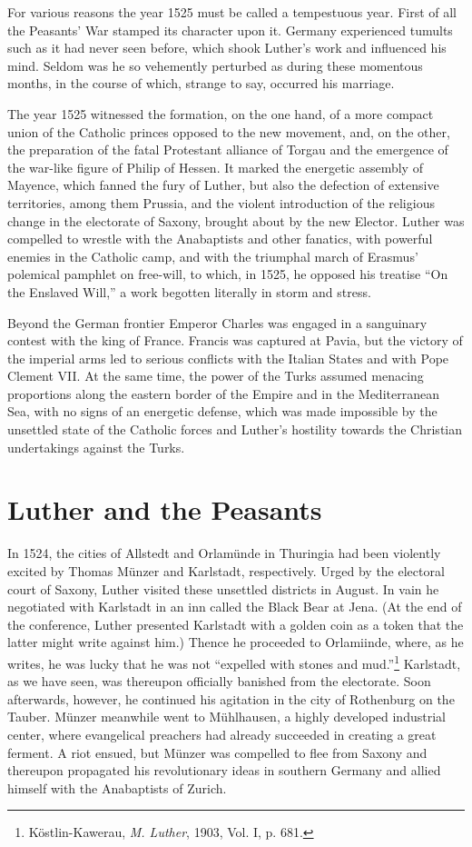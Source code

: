 For various reasons the year 1525 must be called a tempestuous
year. First of all the Peasants’ War stamped its character upon it.
Germany experienced tumults such as it had never seen before, which
shook Luther’s work and influenced his mind. Seldom was he so vehemently
perturbed as during these momentous months, in the
course of which, strange to say, occurred his marriage.

The year 1525 witnessed the formation, on the one hand, of a more
compact union of the Catholic princes opposed to the new movement,
and, on the other, the preparation of the fatal Protestant
alliance of Torgau and the emergence of the war-like figure of Philip
of Hessen. It marked the energetic assembly of Mayence, which
fanned the fury of Luther, but also the defection of extensive territories,
among them Prussia, and the violent introduction of the religious
change in the electorate of Saxony, brought about by the new
Elector. Luther was compelled to wrestle with the Anabaptists and
other fanatics, with powerful enemies in the Catholic camp, and with
the triumphal march of Erasmus’ polemical pamphlet on free-will, to
which, in 1525, he opposed his treatise “On the Enslaved Will,” a
work begotten literally in storm and stress.

Beyond the German frontier Emperor Charles was engaged in a
sanguinary contest with the king of France. Francis was captured at
Pavia, but the victory of the imperial arms led to serious conflicts with
the Italian States and with Pope Clement VII. At the same time,
the power of the Turks assumed menacing proportions along the
eastern border of the Empire and in the Mediterranean Sea, with no
signs of an energetic defense, which was made impossible by the unsettled
state of the Catholic forces and Luther’s hostility towards the
Christian undertakings against the Turks.

\section{Luther and the Peasants}

In 1524, the cities of Allstedt and Orlamünde in Thuringia had
been violently excited by Thomas Münzer and Karlstadt, respectively.
Urged by the electoral court of Saxony, Luther visited these unsettled
districts in August. In vain he negotiated with Karlstadt in
an inn called the Black Bear at Jena. (At the end of the conference,
Luther presented Karlstadt with a golden coin as a token that the latter
might write against him.) Thence he proceeded to Orlamiinde,
where, as he writes, he was lucky that he was not “expelled with
stones and mud.”\footnote{Köstlin-Kawerau, \textit{M. Luther}, 1903, Vol. I, p. 681.}
Karlstadt, as we have seen, was thereupon officially banished from the
electorate. Soon afterwards, however, he
continued his agitation in the city of Rothenburg on the Tauber.
Münzer meanwhile went to Mühlhausen, a highly developed industrial center,
where evangelical preachers had already succeeded in
creating a great ferment. A riot ensued, but Münzer was compelled
to flee from Saxony and thereupon propagated his revolutionary ideas
in southern Germany and allied himself with the Anabaptists of
Zurich.

